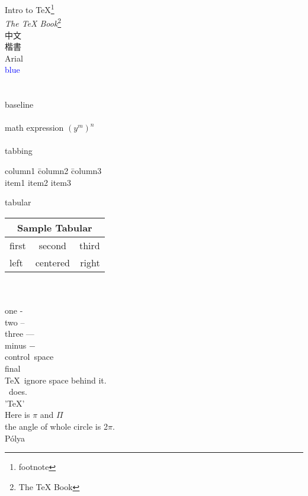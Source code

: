 Intro to \TeX\footnote{footnote}\\
\textit{The TeX Book}\footnote{The TeX Book}\\
{\msjh 中文}\\
{\kai 楷書}\\
{\arial Arial}\\
\textcolor{blue}{blue}\\
\\ \\
baseline \raisebox{1ex}{upward}\raisebox{-1ex}{downward}\\\\
math expression $ (y^m)^n $ \\\\

tabbing
\begin{tabbing}
  column1 \= column2 \= column3 \\
  item1   \> item2   \> item3   \\
\end{tabbing}

tabular\\
\begin{tabular}{|l|c|r|}
  \hline
  \multicolumn{3}{|c|}{Sample Tabular}\\
  \hline
  first & second & third \\
  \cline{2-3}
  left  & centered & right \\
  \hline
\end{tabular}
\\\\
one -\\
two --\\
three ---\\
minus $ - $\\
control\ space\\
final\\
\TeX\ ignore space behind it.\\
\XeTeX\ does.\\
'\TeX'\\
Here is $\pi$ and $\Pi$\\
the angle of whole circle is 2$\pi$.\\
P\'olya\\




